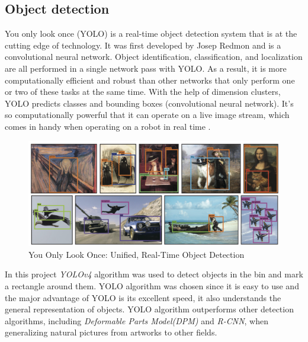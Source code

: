 \subsection{Object detection}


You only look once (YOLO) is a real-time object detection system that is at the cutting edge of technology. 
It was first developed by Josep Redmon and is a convolutional neural network.
Object identification, classification, and localization are all performed in a single network pass with YOLO. 
As a result, it is more computationally efficient and robust than other networks that only perform one or two of these tasks at the same time. 
With the help of dimension clusters, YOLO predicts classes and bounding boxes (convolutional neural network). 
It's so computationally powerful that it can operate on a live image stream, which comes in handy when operating on a robot in real time \cite{redmon_yolov3_2018}.
\begin{figure} [ht]
    \centering
    \includegraphics[width = 0.75 \textwidth]{graphics/yolo.PNG}
    \caption{You Only Look Once: Unified, Real-Time Object Detection \cite{redmon_you_2016}}
    \label{fig:yolo}
\end{figure}


In this project \textit{YOLOv4}\cite{bochkovskiy_yolov4_2020} algorithm was used to detect objects in the bin and mark a rectangle around them. 
YOLO algorithm was chosen since it is easy to use and the major advantage of YOLO is its excellent speed, it also understands the general representation of objects. YOLO algorithm outperforms other detection algorithms, including \textit{Deformable Parts Model(DPM)} and \textit{R-CNN}, when generalizing natural pictures from artworks to other fields\cite{zou_object_2019}.



